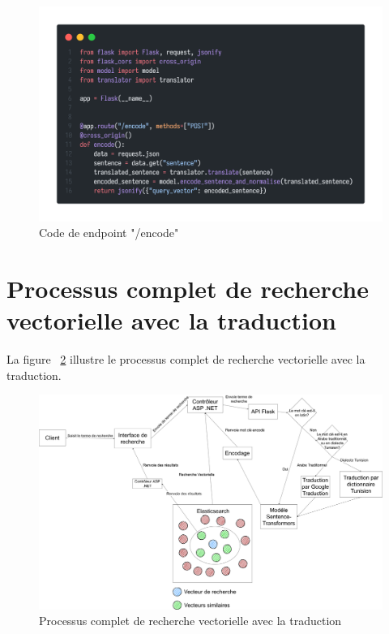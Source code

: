 \begin{figure}[H]
	\centering
	\includegraphics[width=1\textwidth]{logos/encodeendpoint.png}
	\caption{Code de endpoint "/encode"}
	\label{fig:encodeendpoint}
\end{figure}

\newpage
\noindent
\section{Processus complet de recherche vectorielle avec la traduction}
\noindent
La figure ~\ref{fig:fullprocesswithtranslation} illustre le processus complet de recherche vectorielle avec la traduction.

\begin{figure}[H]
	\includegraphics[width=1\textwidth]{logos/fullprocesswithtranslation.png}
	\caption{Processus complet de recherche vectorielle avec la traduction}
	\label{fig:fullprocesswithtranslation}
\end{figure}


